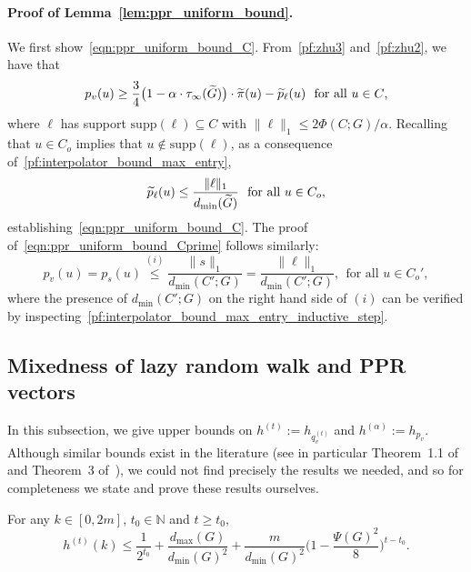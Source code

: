 \paragraph{Proof of Lemma~\ref{lem:ppr_uniform_bound}.}
	We first show~\eqref{eqn:ppr_uniform_bound_C}. From~\eqref{pf:zhu3} and~\eqref{pf:zhu2}, we have that
	\begin{equation*}
	p_v(u) \geq \frac{3}{4}\bigl(1 - \alpha \cdot \tau_{\infty}(\widetilde{G})\bigr) \cdot \widetilde{\pi}(u) - \widetilde{p}_{\ell}(u)~~\textrm{for all $u \in C$,}
	\end{equation*}
	where $\ell$ has support $\mathrm{supp}(\ell) \subseteq C$ with $\|\ell\|_1 \leq 2\Phi(C;G)/\alpha$. Recalling that $u \in C_{o}$ implies that $u \not\in \mathrm{supp}(\ell)$, as a consequence of~\eqref{pf:interpolator_bound_max_entry}, 
	\begin{equation*}
	\widetilde{p}_{\ell}(u) \leq \frac{\|\ell\|_1}{d_{\min}(\widetilde{G})}~~\textrm{for all $u \in C_{o}$,}
	\end{equation*}
	establishing~\eqref{eqn:ppr_uniform_bound_C}. The proof of~\eqref{eqn:ppr_uniform_bound_Cprime} follows similarly:
	\begin{equation*}
	p_v(u) = p_s(u) \overset{(i)}{\leq} \frac{\|s\|_1}{d_{\min}(C';G)} = \frac{\|\ell\|_1}{d_{\min}(C';G)},~~\textrm{for all $u \in C_{o}'$},
	\end{equation*}
	where the presence of $d_{\min}(C';G)$ on the right hand side of $(i)$ can be verified by inspecting~\eqref{pf:interpolator_bound_max_entry_inductive_step}. 	

\subsection{Mixedness of lazy random walk and PPR vectors}
\label{subsec:lovasz_simonovits_bounds}
In this subsection, we give upper bounds on $h^{(t)} := h_{q_v^{(t)}}$ and $h^{(\alpha)} := h_{p_v}$. Although similar bounds exist in the literature (see in particular Theorem~1.1 of \citep{lovasz1990} and Theorem~3 of~\citep{andersen2006}), we could not find precisely the results we needed, and so for completeness we state and prove these results ourselves. 

\begin{theorem}
	\label{thm:mixing_time_rw}
	For any $k \in [0, 2m]$, $t_0 \in \mathbb{N}$ and $t \geq t_0$,
	\begin{equation}
	\label{eqn:mixing_time_rw_1}
	h^{(t)}(k) \leq \frac{1}{2^{t_0}} + \frac{d_{\max}(G)}{d_{\min}(G)^2} + \frac{m}{d_{\min}(G)^2} \biggl(1 - \frac{\Psi(G)^2}{8}\biggr)^{t - t_0}.
	\end{equation}
\end{theorem}


